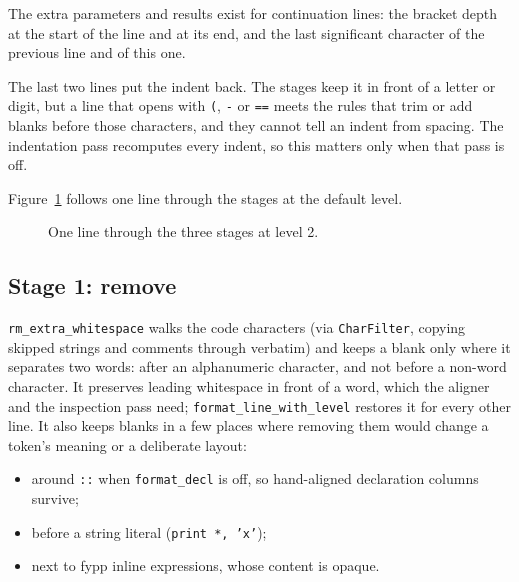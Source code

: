 \documentclass[11pt,a4paper,openany]{book}
\newcommand{\code}[1]{\texttt{\small #1}}
\begin{document}
The extra parameters and results exist for continuation lines: the bracket
depth at the start of the line and at its end, and the last significant
character of the previous line and of this one.

The last two lines put the indent back. The stages keep it in front of a
letter or digit, but a line that opens with \code{(}, \code{-} or \code{==}
meets the rules that trim or add blanks before those characters, and they
cannot tell an indent from spacing. The indentation pass recomputes every
indent, so this matters only when that pass is off.

Figure~\ref{fig:ws-stages} follows one line through the stages at the default
level.

\begin{figure}[ht]
\centering
{}
\caption{One line through the three stages at level 2.}
\label{fig:ws-stages}
\end{figure}

\subsection{Stage 1: remove}

\code{rm\_extra\_whitespace} walks the code characters (via \code{CharFilter},
copying skipped strings and comments through verbatim) and keeps a blank only
where it separates two words: after an alphanumeric character, and not before a
non-word character. It preserves leading whitespace in front of a word, which
the aligner and the inspection pass need; \code{format\_line\_with\_level}
restores it for every other line. It also keeps blanks in a few places where removing them
would change a token's meaning or a deliberate layout:

\begin{itemize}
  \item around \code{::} when \code{format\_decl} is off, so hand-aligned
    declaration columns survive;
  \item before a string literal (\code{print *, 'x'});
  \item next to fypp inline expressions, whose content is opaque.
\end{itemize}
\end{document}
